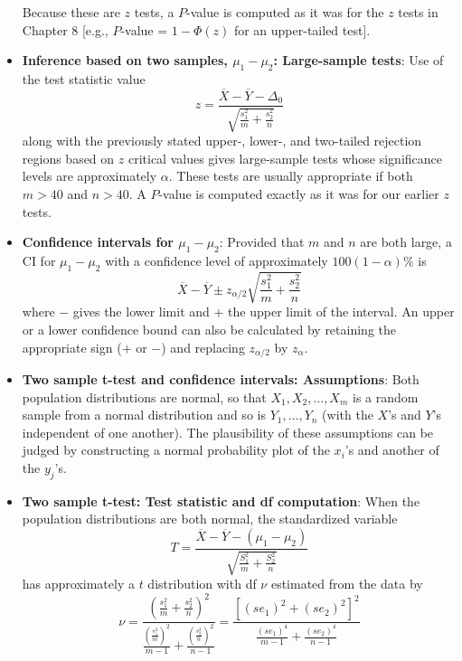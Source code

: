 \documentclass{report}
\begin{document}
\begin{itemize}
\begin{tabbing}
        \end{tabbing}
        Because these are $z$ tests, a $P$-value is computed as it was for the $z$ tests in Chapter 8 [e.g., $P$-value = $1 - \Phi(z)$ for an upper-tailed test].
        \item \textbf{Inference based on two samples, $\mu_{1} - \mu_{2}$: Large-sample tests}:
        Use of the test statistic value
        \[
            z = \frac{\overline{X} - \overline{Y} - \Delta_0}{\sqrt{\frac{s_1^2}{m} + \frac{s_2^2}{n}}}
        \]
        along with the previously stated upper-, lower-, and two-tailed rejection regions based on $z$ critical values gives large-sample tests whose significance levels are approximately $\alpha$. These tests are usually appropriate if both $m > 40$ and $n > 40$. A $P$-value is computed exactly as it was for our earlier $z$ tests.
        \item \textbf{Confidence intervals for $\mu_{1} - \mu_{2}$}:
        Provided that $m$ and $n$ are both large, a CI for $\mu_1 - \mu_2$ with a confidence level of approximately $100(1 - \alpha)\%$ is
        \[
            \overline{X} - \overline{Y} \pm z_{\alpha/2} \sqrt{\frac{s_1^2}{m} + \frac{s_2^2}{n}}
        \]
        where $-$ gives the lower limit and $+$ the upper limit of the interval. An upper or a lower confidence bound can also be calculated by retaining the appropriate sign ($+$ or $-$) and replacing $z_{\alpha/2}$ by $z_{\alpha}$.
    \item \textbf{Two sample t-test and confidence intervals: Assumptions}:
        Both population distributions are normal, so that $X_1, X_2, \ldots, X_m$ is a random sample from a normal distribution and so is $Y_1, \ldots, Y_n$ (with the $X$'s and $Y$'s independent of one another). The plausibility of these assumptions can be judged by constructing a normal probability plot of the $x_i$'s and another of the $y_j$'s.
    \item \textbf{Two sample t-test: Test statistic and df computation}:
        When the population distributions are both normal, the standardized variable
        \[
            T = \frac{\overline{X} - \overline{Y} - (\mu_1 - \mu_2)}{\sqrt{\frac{S_1^2}{m} + \frac{S_2^2}{n}}}
        \]
        has approximately a $t$ distribution with df $\nu$ estimated from the data by
        \[
            \nu = \frac{\left( \frac{s_1^2}{m} + \frac{s_2^2}{n} \right)^2}{\frac{\left( \frac{s_1^2}{m} \right)^2}{m - 1} + \frac{\left( \frac{s_2^2}{n} \right)^2}{n - 1}} = \frac{[(se_1)^2 + (se_2)^2]^2}{\frac{(se_1)^4}{m - 1} + \frac{(se_2)^4}{n - 1}}
\]
\end{itemize}
\end{document}
